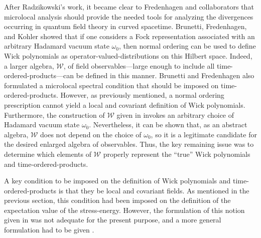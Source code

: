 After Radzikowski's work, it became clear to Fredenhagen and
collaborators that microlocal analysis should provide the needed tools
for analyzing the divergences occurring in quantum field theory in
curved spacetime. Brunetti, Fredenhagen, and Kohler \cite{bfk} showed
that if one considers a Fock representation associated with an
arbitrary Hadamard vacuum state $\omega_0$, then normal ordering can
be used to define Wick polynomials as operator-valued-distributions on
this Hilbert space. Indeed, a larger algebra, $\mathcal W$, of field
observables---large enough to include all time-ordered-products---can
be defined in this manner. Brunetti and Fredenhagen \cite{bf} also
formulated a microlocal spectral condition that should be imposed on
time-ordered-products. However, as previously mentioned, a normal
ordering prescription cannot yield a local and covariant definition of
Wick polynomials. Furthermore, the construction of $\mathcal W$ given
in \cite{bfk} invokes an arbitrary choice of Hadamard vacuum state
$\omega_0$. Nevertheless, it can be shown that, as an abstract
algebra, $\mathcal W$ does not depend on the choice of $\omega_0$, so
it is a legitimate candidate for the desired enlarged algebra of
observables. Thus, the key remaining issue was to determine which
elements of $\mathcal W$ properly represent the ``true'' Wick
polynomials and time-ordered-products.

A key condition to be imposed on the definition of Wick polynomials
and time-ordered-products is that they be local and covariant fields.
As mentioned in the previous section, this condition had been imposed
on the definition of the expectation value of the stress-energy.
However, the formulation of this notion given in \cite{w2} was not
adequate for the present purpose, and a more general formulation had
to be given \cite{hw1,bfv}.

